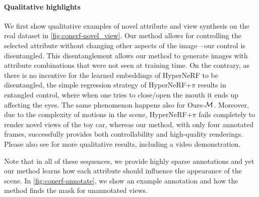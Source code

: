     \paragraph{Qualitative highlights}
      We first show qualitative examples of novel attribute and view synthesis
      on the real dataset in \cref{fig:conerf-novel_view}.
      Our method allows for controlling the selected attribute without
      changing other aspects of the image---our control is disentangled.
      This disentanglement allows our method to generate images with attribute
      combinations that were not seen at training time.
      On the contrary, as there is no incentive for the learned embeddings of
      HyperNeRF to be disentangled, the simple regression strategy of
      HyperNeRF{+}$\pi$ results in entangled control, where when one tries to
      close/open the mouth it ends up affecting the eyes.
      The same phenomenon happens also for Ours{-}$\mathcal{M}$.
      Moreover, due to the complexity of motions in the scene,
      HyperNeRF{+}$\pi$ fails completely to render novel views of the toy car,
      whereas our method, with only four annotated frames, successfully
      provides both controllability and high-quality renderings.
      Please also see \SupplementaryMaterial for more qualitative results,
      including a video demonstration.

      Note that in all of these sequences, we provide highly sparse
      annotations and yet our method learns how each attribute should
      influence the appearance of the scene.
      In \cref{fig:conerf-annotate}, we show an example annotation and how the
      method finds the mask for unannotated views.

      
      
